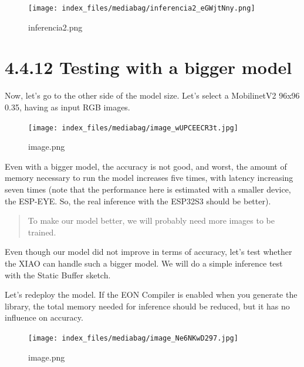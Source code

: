 \documentclass[
  letterpaper,
  DIV=11,
  numbers=noendperiod]{scrreprt}
\begin{document}
\begin{figure}[H]

{\centering \texttt{[image: index\_files/mediabag/inferencia2\_eGWjtNny.png]}

}

\caption{inferencia2.png}

\end{figure}

\hypertarget{testing-with-a-bigger-model}{%
\section*{4.4.12 Testing with a bigger
model}\label{testing-with-a-bigger-model}}


Now, let's go to the other side of the model size. Let's select a
MobilinetV2 96x96 0.35, having as input RGB images.

\begin{figure}[H]

{\centering \texttt{[image: index\_files/mediabag/image\_wUPCEECR3t.jpg]}

}

\caption{image.png}

\end{figure}

Even with a bigger model, the accuracy is not good, and worst, the
amount of memory necessary to run the model increases five times, with
latency increasing seven times (note that the performance here is
estimated with a smaller device, the ESP-EYE. So, the real inference
with the ESP32S3 should be better).

\begin{quote}
To make our model better, we will probably need more images to be
trained.
\end{quote}

Even though our model did not improve in terms of accuracy, let's test
whether the XIAO can handle such a bigger model. We will do a simple
inference test with the Static Buffer sketch.

Let's redeploy the model. If the EON Compiler is enabled when you
generate the library, the total memory needed for inference should be
reduced, but it has no influence on accuracy.

\begin{figure}[H]

{\centering \texttt{[image: index\_files/mediabag/image\_Ne6NKwD297.jpg]}

}

\caption{image.png}

\end{figure}
\end{document}
